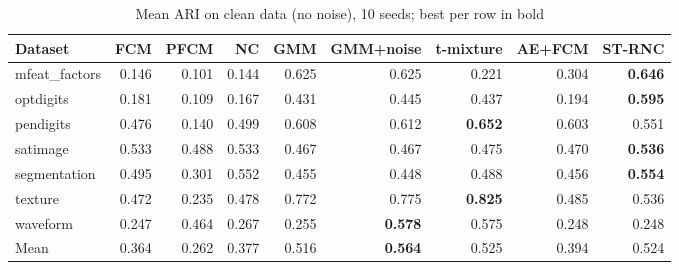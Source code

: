 \begin{table}[t]
\centering
\scriptsize
\setlength{\tabcolsep}{3pt}
\caption{Mean ARI on clean data (no noise), 10 seeds; best per row in bold}
\label{tab:clean}
\begin{tabular}{lrrrrrrrr}
\toprule
Dataset & FCM & PFCM & NC & GMM & GMM+noise & t-mixture & AE+FCM & ST-RNC \\
\midrule
mfeat\_factors & 0.146 & 0.101 & 0.144 & 0.625 & 0.625 & 0.221 & 0.304 & \textbf{0.646} \\
optdigits & 0.181 & 0.109 & 0.167 & 0.431 & 0.445 & 0.437 & 0.194 & \textbf{0.595} \\
pendigits & 0.476 & 0.140 & 0.499 & 0.608 & 0.612 & \textbf{0.652} & 0.603 & 0.551 \\
satimage & 0.533 & 0.488 & 0.533 & 0.467 & 0.467 & 0.475 & 0.470 & \textbf{0.536} \\
segmentation & 0.495 & 0.301 & 0.552 & 0.455 & 0.448 & 0.488 & 0.456 & \textbf{0.554} \\
texture & 0.472 & 0.235 & 0.478 & 0.772 & 0.775 & \textbf{0.825} & 0.485 & 0.536 \\
waveform & 0.247 & 0.464 & 0.267 & 0.255 & \textbf{0.578} & 0.575 & 0.248 & 0.248 \\
Mean & 0.364 & 0.262 & 0.377 & 0.516 & \textbf{0.564} & 0.525 & 0.394 & 0.524 \\
\bottomrule
\end{tabular}
\end{table}
